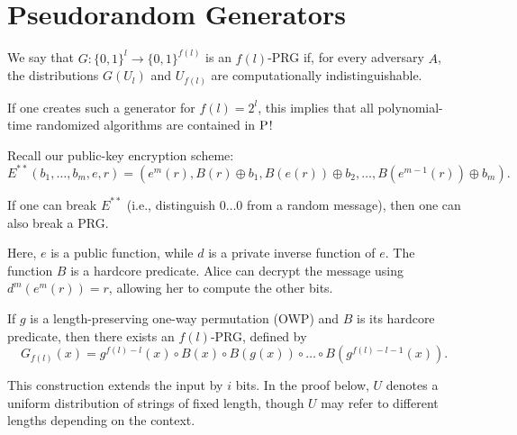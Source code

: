 \section{Pseudorandom Generators}

\begin{definition}
  We say that $G \colon \{0,1\}^l \to \{0,1\}^{f(l)}$ is an $f(l)$-PRG if, for every adversary $A$, the distributions $G(U_l)$ and $U_{f(l)}$ are computationally indistinguishable.
\end{definition}

If one creates such a generator for $f(l) = 2^{l}$, this implies that all polynomial-time randomized algorithms are contained in $\operatorname{P}$!

Recall our public-key encryption scheme:
\[
E^{**}(b_1, \ldots, b_m, e, r) = \left(e^{m}(r), B(r) \oplus b_1, B(e(r)) \oplus b_2, \ldots, B(e^{m - 1}(r)) \oplus b_m\right).
\] 

\begin{theorem}
  If one can break $E^{**}$ (i.e., distinguish $0\ldots0$ from a random message), then one can also break a PRG.
\end{theorem}

Here, $e$ is a public function, while $d$ is a private inverse function of $e$.
The function $B$ is a hardcore predicate.
Alice can decrypt the message using $d^{m}(e^{m}(r)) = r$, allowing her to compute the other bits.

\begin{lemma}
	If $g$ is a length-preserving one-way permutation (OWP) and $B$ is its hardcore predicate, then there exists an $f(l)$-PRG, defined by
	 \[
	  G_{f(l)}(x) = g^{f(l) - l}(x) \circ B(x) \circ B(g(x)) \circ \dots \circ B(g^{f(l) - l - 1}(x)).
	 \] 
\end{lemma}
This construction extends the input by $i$ bits.
In the proof below, $U$ denotes a uniform distribution of strings of fixed length, though $U$ may refer to different lengths depending on the context.

